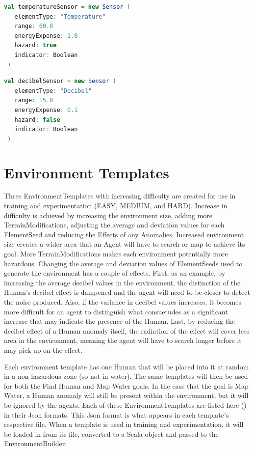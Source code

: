 \begin{lstlisting}[language=Scala]
 val temperatureSensor = new Sensor (
   elementType: "Temperature"
   range: 60.0
   energyExpense: 1.0
   hazard: true
   indicator: Boolean
 )
\end{lstlisting}

\begin{lstlisting}[language=Scala]
 val decibelSensor = new Sensor (
   elementType: "Decibel"
   range: 15.0
   energyExpense: 0.1
   hazard: false
   indicator: Boolean
 )
\end{lstlisting}


\section{Environment Templates}
Three EnvironmentTemplates with increasing difficulty are created for use in training and experimentation (EASY, MEDIUM, and HARD).
Increase in difficulty is achieved by increasing the environment size, adding more TerrainModifications, adjusting the average and deviation values for each ElementSeed and reducing the Effects of any Anomalies.
Increased environment size creates a wider area that an Agent will have to search or map to achieve its goal.
More TerrainModifications makes each environment potentially more hazardous.
Changing the average and deviation values of ElementSeeds used to generate the environment has a couple of effects.
First, as an example, by increasing the average decibel values in the environment, the distinction of the Human's decibel effect is dampened and the agent will need to be closer to detect the noise produced.
Also, if the variance in decibel values increases, it becomes more difficult for an agent to distinguish what consuetudes as a significant increase that may indicate the presence of the Human.
Last, by reducing the decibel effect of a Human anomaly itself, the radiation of the effect will cover less area in the environment, meaning the agent will have to search longer before it may pick up on the effect.

Each environment template has one Human that will be placed into it at random in a non-hazardous zone (so not in water).
The same templates will then be used for both the Find Human and Map Water goals.
In the case that the goal is Map Water, a Human anomaly will still be present within the environment, but it will be ignored by the agents.
Each of these EnvironmentTemplates are listed here () in their Json formats.
This Json format is what appears in each template's respective file.
When a template is used in training and experimentation, it will be loaded in from its file, converted to a Scala object and passed to the EnvironmentBuilder.



